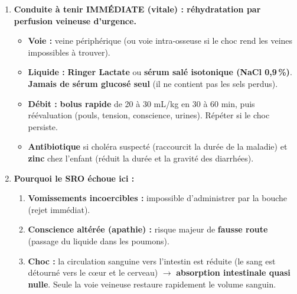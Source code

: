 \documentclass[11pt]{article}
\newcommand{\cle}[1]{{\popxbold\color{popdark}#1}}
\begin{document}
\begin{exoresolu}
\begin{enumerate}
\begin{itemize}
                \item Choléra (toxine) / rotavirus : la toxine provoque l'ouverture de canaux qui \textbf{rejettent massivement l'eau et les sels (Na$^+$, Cl$^-$, K$^+$, HCO$_3^-$)} dans l'intestin, au-delà de ce que le côlon peut réabsorber.
                \item Résultat : pertes hydriques énormes + perte de bicarbonates $\rightarrow$ \textbf{acidification du sang}.
            \end{itemize}
        \item \textbf{Conduite à tenir IMMÉDIATE (vitale) : \cle{réhydratation par perfusion veineuse d'urgence}.}
            \begin{itemize}
                \item \textbf{Voie :} veine périphérique (ou voie intra-osseuse si le choc rend les veines impossibles à trouver).
                \item \textbf{Liquide :} \textbf{Ringer Lactate} ou \textbf{sérum salé isotonique (NaCl 0,9\,\%)}. \textbf{Jamais de sérum glucosé seul} (il ne contient pas les sels perdus).
                \item \textbf{Débit :} \textbf{bolus rapide} de 20 à 30 mL/kg en 30 à 60 min, puis réévaluation (pouls, tension, conscience, urines). Répéter si le choc persiste.
                \item \textbf{Antibiotique} si choléra suspecté (raccourcit la durée de la maladie) et \textbf{zinc} chez l'enfant (réduit la durée et la gravité des diarrhées).
            \end{itemize}
        \item \textbf{Pourquoi le SRO échoue ici :}
            \begin{enumerate}
                \item \textbf{Vomissements incoercibles :} impossible d'administrer par la bouche (rejet immédiat).
                \item \textbf{Conscience altérée (apathie) :} risque majeur de \textbf{fausse route} (passage du liquide dans les poumons).
                \item \textbf{Choc :} la circulation sanguine vers l'intestin est réduite (le sang est détourné vers le cœur et le cerveau) $\rightarrow$ \textbf{absorption intestinale quasi nulle}. Seule la voie veineuse restaure rapidement le volume sanguin.
            \end{enumerate}
    \end{enumerate}
\end{exoresolu}
\end{document}

